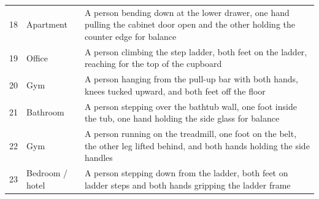 \begin{table}[!htbp]
\begin{tabularx}{\textwidth}{@{}llX@{}}
    18 & Apartment & A person bending down at the lower drawer, one hand pulling the cabinet door open and the other holding the counter edge for balance \\
    19 & Office & A person climbing the step ladder, both feet on the ladder, reaching for the top of the cupboard \\
    20 & Gym & A person hanging from the pull-up bar with both hands, knees tucked upward, and both feet off the floor \\
    21 & Bathroom & A person stepping over the bathtub wall, one foot inside the tub, one hand holding the side glass for balance \\
    22 & Gym & A person running on the treadmill, one foot on the belt, the other leg lifted behind, and both hands holding the side handles \\
    23 & Bedroom / hotel & A person stepping down from the ladder, both feet on ladder steps and both hands gripping the ladder frame \\
    \bottomrule
  \end{tabularx}
\end{table}

